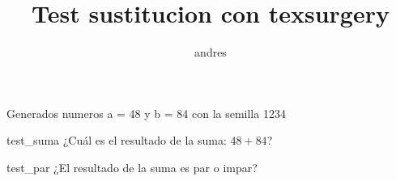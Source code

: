 \documentclass[a4paper]{article}
\title{Test sustitucion con texsurgery}
\author{andres}
\begin{document}
Generados numeros a = 48 y b = 84 con la semilla 1234
 \newline \newline

\begin{question}{test_suma}
    ¿Cuál es el resultado de la suma: $48 + 84$?
    \begin{choices}
    \end{choices}
\end{question}


\begin{question}{test_par}
    ¿El resultado de la suma es par o impar?
    \begin{choices}
    \end{choices}
\end{question}
\end{document}
